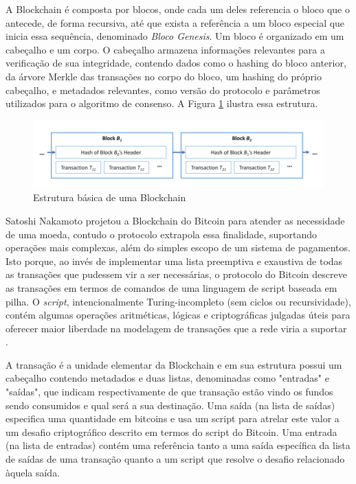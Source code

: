 \documentclass[a4paper,11pt]{article}
\begin{document}
A Blockchain é composta por blocos, onde cada um deles referencia o bloco que o antecede, de forma recursiva, até que exista a referência a um bloco especial que inicia essa sequência, denominado \emph{Bloco Genesis}.
Um bloco é organizado em um cabeçalho e um corpo.
O cabeçalho armazena informações relevantes para a verificação de sua integridade, contendo dados como o hashing do bloco anterior, da árvore Merkle das transações no corpo do bloco, um hashing do próprio cabeçalho, e metadados relevantes, como versão do protocolo e parâmetros utilizados para o algoritmo de consenso.
A Figura \ref{fig:blockchain} ilustra essa estrutura.

\begin{figure}[htp]
    \centering
    \includegraphics[width=\textwidth]{images/exemplo-de-blockchain.png}
    \caption{Estrutura básica de uma Blockchain}
    \label{fig:blockchain}
\end{figure}

Satoshi Nakamoto projetou a Blockchain do Bitcoin para atender as necessidade de uma moeda, contudo o protocolo extrapola essa finalidade, suportando operações mais complexas, além do simples escopo de um sistema de pagamentos.
Isto porque, ao invés de implementar uma lista preemptiva e exaustiva de todas as transações que pudessem vir a ser necessárias, o protocolo do Bitcoin descreve as transações em termos de comandos de uma linguagem de script baseada em pilha. O \emph{script}, intencionalmente Turing-incompleto (sem ciclos ou recursividade), contém algumas operações aritméticas, lógicas e criptográficas julgadas úteis para oferecer maior liberdade na modelagem de transações que a rede viria a suportar \cite{Narayanan2016a}.


A transação é a unidade elementar da Blockchain e em sua estrutura possui um cabeçalho contendo metadados e duas listas, denominadas como "entradas" e "saídas", que indicam respectivamente de que transação estão vindo os fundos sendo consumidos e qual será a sua destinação.
Uma saída (na lista de saídas) especifica uma quantidade em bitcoins e usa um script para atrelar este valor a um desafio criptográfico descrito em termos do script do Bitcoin.
Uma entrada (na lista de entradas) contém uma referência tanto a uma saída específica da lista de saídas de uma transação quanto a um script que resolve o desafio relacionado àquela saída.
\end{document}
